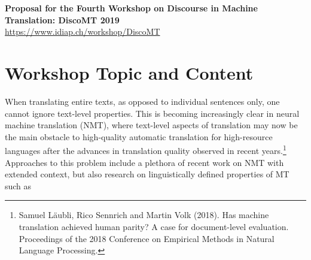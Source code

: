 \documentclass[11pt]{article}
\begin{document}
\begin{center}
\Large{\textbf{Proposal for the Fourth Workshop on Discourse in Machine Translation: DiscoMT 2019}}\\
\url{https://www.idiap.ch/workshop/DiscoMT}
\end{center}



\section{Workshop Topic and Content}




When translating entire texts, as opposed to individual sentences only, 
one cannot ignore text-level properties. This is becoming increasingly
clear in neural machine translation (NMT), where text-level aspects of
translation may now be the main obstacle to high-quality automatic
translation for high-resource languages after the advances in translation
quality observed in recent years.\footnote{Samuel Läubli, Rico Sennrich
and Martin Volk (2018). Has machine translation achieved human parity? A case
for document-level evaluation. Proceedings of the 2018 Conference on
Empirical Methods in Natural Language Processing.} Approaches to this
problem include a plethora of recent work on NMT with extended context, but also
research on linguistically defined properties of MT such as
\end{document}
